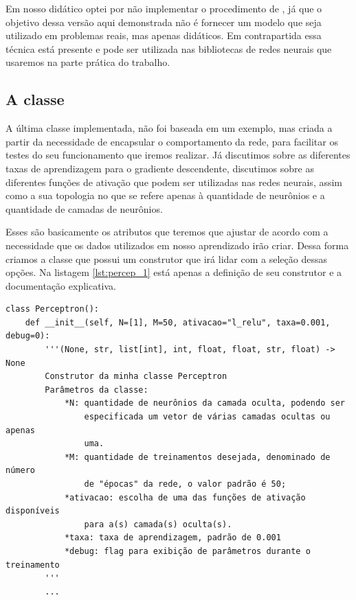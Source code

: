 Em nosso  didático optei por não implementar o procedimento de , já que o objetivo dessa versão aqui demonstrada não é fornecer um modelo que seja utilizado em problemas reais, mas apenas didáticos. Em contrapartida essa técnica está presente e pode ser utilizada nas bibliotecas de redes neurais que usaremos na parte prática do trabalho.

\subsection{A classe }

A última classe implementada, não foi baseada em um exemplo, mas criada a partir da necessidade de encapsular o comportamento da rede, para facilitar os testes do seu funcionamento que iremos realizar. Já discutimos sobre as diferentes taxas de aprendizagem para o gradiente descendente, discutimos sobre as diferentes funções de ativação que podem ser utilizadas nas redes neurais, assim como a sua topologia no que se refere apenas à quantidade de neurônios e a quantidade de camadas de neurônios.

Esses são basicamente os atributos que teremos que ajustar de acordo com a necessidade que os dados utilizados em nosso aprendizado irão criar. Dessa forma criamos a classe  que possui um construtor que irá lidar com a seleção dessas opções. Na listagem \ref{lst:percep_1} está apenas a definição de seu construtor e a documentação explicativa.

\begin{scriptsize}
\estiloR
\begin{lstlisting}[caption={Trecho da classe \eng{Perceptron}}, label={lst:percep_1}, escapeinside={\%}]
class Perceptron():
    def __init__(self, N=[1], M=50, ativacao="l_relu", taxa=0.001, debug=0):
	    '''(None, str, list[int], int, float, float, str, float) -> None
	    Construtor da minha classe Perceptron
	    Parâmetros da classe:
	        *N: quantidade de neurônios da camada oculta, podendo ser
	            especificada um vetor de várias camadas ocultas ou apenas
	            uma.
	        *M: quantidade de treinamentos desejada, denominado de número
	            de "épocas" da rede, o valor padrão é 50;
	        *ativacao: escolha de uma das funções de ativação disponíveis
	            para a(s) camada(s) oculta(s).
	        *taxa: taxa de aprendizagem, padrão de 0.001
	        *debug: flag para exibição de parâmetros durante o treinamento
	    '''
	    ...
\end{lstlisting}
\end{scriptsize}

